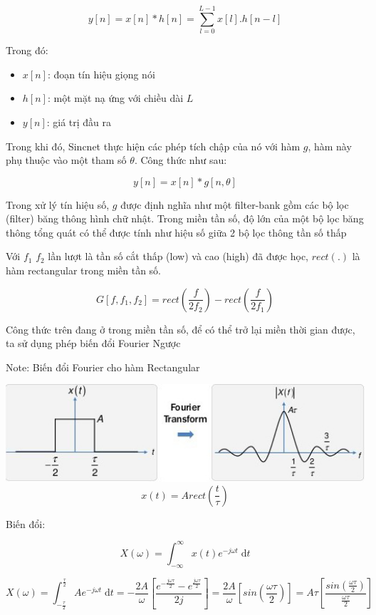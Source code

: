 \documentclass{article}
\begin{document}
	$$y[n] = x[n] * h[n] = \sum_{l=0}^{L-1}x[l].h[n-l]$$ 
	
	Trong đó:
	\begin{itemize}
		\item $x[n]$: đoạn tín hiệu giọng nói
		\item $h[n]$: một mặt nạ ứng với chiều dài $L$
		\item $y[n]$: giá trị đầu ra
	\end{itemize}
	
	Trong khi đó, Sincnet thực hiện các phép tích chập của nó với hàm $g$, hàm này phụ thuộc vào một tham số $\theta$. Công thức như sau:
	
	$$y[n] = x[n] * g[n, \theta]$$
	
	Trong xử lý tín hiệu số, $g$ được định nghĩa như một filter-bank gồm các bộ lọc (filter) băng thông hình chữ nhật. Trong miền tần số, độ lớn của một bộ lọc băng thông tổng quát có thể được tính như hiệu số giữa 2 bộ lọc thông tần số thấp
	
	Với $f_1$ $f_2$ lần lượt là tần số cắt thấp (low) và cao (high) đã được học, $rect(.)$ là hàm rectangular trong miền tần số.
	
	$$G[f, f_1, f_2] = rect\left(\frac{f}{2f_2}\right) -  rect\left(\frac{f}{2f_1}\right)$$
	
	Công thức trên đang ở trong miền tần số, để có thể trở lại miền thời gian được, ta sử dụng phép biến đổi Fourier Ngược
	
	Note: Biến đổi Fourier cho hàm Rectangular
	
	\includegraphics[width=1\textwidth]{images/rect_fourier.jpg}\\
	
	$$x(t) = Arect(\frac{t}{\tau})$$
	
	Biến đổi:
	
	$$X(\omega) = \int_{-\infty}^{\infty} x(t)e^{-j \omega t}\;\mathrm{d}t 
	$$
	
	$$X(\omega) = \int_{-\frac{\tau}{2}}^{\frac{\tau}{2}} Ae^{-j \omega t}\;\mathrm{d}t 
	= -\frac{2A}{\omega}\left[\frac{e^{-\frac{j \omega \tau}{2}} - e^{\frac{j \omega \tau}{2}}}{2j}\right]
	= \frac{2A}{\omega} \left[sin\left(\frac{\omega \tau}{2}\right)\right]
	= A\tau \left[\frac{sin(\frac{\omega \tau}{2})}{\frac{\omega \tau}{2}}\right]
	$$
	
\end{document}
